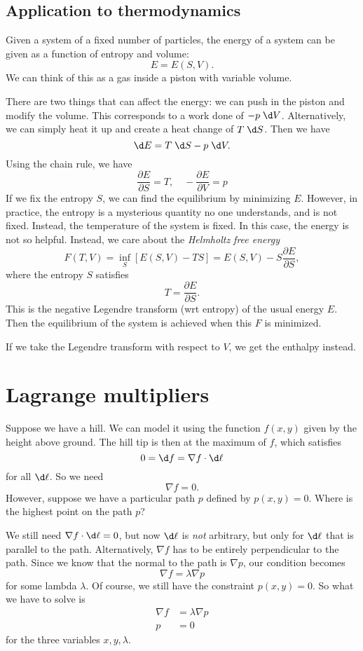 \documentclass[a4paper]{article}
\begin{document}
\subsection{Application to thermodynamics}
Given a system of a fixed number of particles, the energy of a system can be given as a function of entropy and volume:
\[
  E = E(S, V).
\]
We can think of this as a gas inside a piston with variable volume.

There are two things that can affect the energy: we can push in the piston and modify the volume. This corresponds to a work done of $-p\;\d V$. Alternatively, we can simply heat it up and create a heat change of $T\;\d S$. Then we have
\[
  \d E = T\;\d S - p\;\d V.
\]
Using the chain rule, we have
\[
  \frac{\partial E}{\partial S} = T,\quad -\frac{\partial E}{\partial V} = p
\]
If we fix the entropy $S$, we can find the equilibrium by minimizing $E$. However, in practice, the entropy is a mysterious quantity no one understands, and is not fixed. Instead, the temperature of the system is fixed. In this case, the energy is not so helpful. Instead, we care about the \emph{Helmholtz free energy}
\[
  F(T, V) = \inf_S [E(S, V) - TS] = E(S, V) - S\frac{\partial E}{\partial S},
\]
where the entropy $S$ satisfies
\[
  T = \frac{\partial E}{\partial S}.
\]
This is the negative Legendre transform (wrt entropy) of the usual energy $E$.  Then the equilibrium of the system is achieved when this $F$ is minimized.

If we take the Legendre transform with respect to $V$, we get the enthalpy instead.

\section{Lagrange multipliers}
Suppose we have a hill. We can model it using the function $f(x, y)$ given by the height above ground. The hill tip is then at the maximum of $f$, which satisfies
\[
  0 = \d f = \nabla f\cdot \d \mathbf{\ell}
\]
for all $\d \mathbf{\ell}$. So we need
\[
  \nabla f = 0.
\]
However, suppose we have a particular path $p$ defined by $p(x, y) = 0$. Where is the highest point on the path $p$?

We still need $\nabla f \cdot \d \mathbf{\ell} = 0$, but now $\d \mathbf{\ell}$ is \emph{not} arbitrary, but only for $\d \ell$ that is parallel to the path. Alternatively, $\nabla f$ has to be entirely perpendicular to the path. Since we know that the normal to the path is $\nabla p$, our condition becomes
\[
  \nabla f = \lambda \nabla p
\]
for some lambda $\lambda$. Of course, we still have the constraint $p(x, y) = 0$. So what we have to solve is
\begin{align*}
  \nabla f &= \lambda \nabla p\\
  p &= 0
\end{align*}
for the three variables $x, y, \lambda$.
\end{document}
